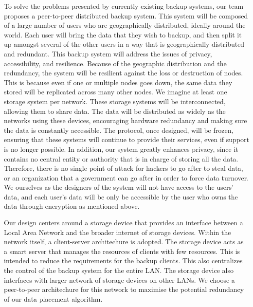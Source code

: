 To solve the problems presented by currently existing backup systems, our team proposes a peer-to-peer distributed backup system.  This system will be composed of a large number of users who are geographically distributed, ideally around the world.  Each user will bring the data that they wish to backup, and then split it up amongst several of the other users in a way that is geographically distributed and redundant.  This backup system will address the issues of privacy, accessibility, and resilience.  Because of the geographic distribution and the redundancy, the system will be resilient against the loss or destruction of nodes.  This is because even if one or multiple nodes goes down, the same data they stored will be replicated across many other nodes.
We imagine at least one storage system per network. These storage systems will be interconnected, allowing them to share data. The data will be distributed as widely as the networks using these devices, encouraging hardware redundancy and making sure the data is constantly accessible. The protocol, once designed, will be frozen, ensuring that these systems will continue to provide their services, even if support is no longer possible. In addition, our system greatly enhances privacy, since it contains no central entity or authority that is in charge of storing all the data.  Therefore, there is no single point of attack for hackers to go after to steal data, or an organization that a government can go after in order to force data turnover.  We ourselves as the designers of the system will not have access to the users' data, and each user's data will be only be accessible by the user who owns the data through encryption as mentioned above.

Our design centers around a storage device that provides an interface between a Local Area Network and the broader internet of storage devices. Within the network itself, a client-server architechure is adopted. The storage device acts as a smart server that manages the resources of clients with few resources. This is intended to reduce the requirements for the backup clients. This also centralizes the control of the backup system for the entire LAN. The storage device also interfaces with larger network of storage devices on other LANs. We choose a peer-to-peer architechure for this network to maximise the potential redundancy of our data placement algorithm.

